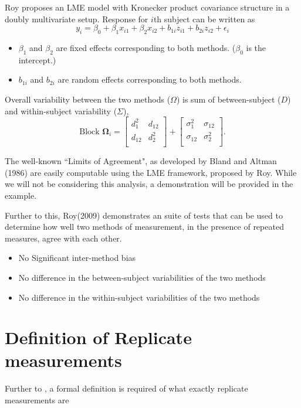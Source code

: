 \documentclass[12pt, a4paper]{report}
\theoremstyle{plain}
\theoremstyle{definition}
\theoremstyle{remark}
\begin{document}
	
	Roy proposes an LME model with Kronecker product covariance structure in a doubly multivariate setup. Response for $i$th subject can be written as
	\[ y_i = \beta_0 + \beta_1x_{i1} + \beta_2x_{i2} + b_{1i}z_{i1}  + b_{2i}z_{i2} + \epsilon_i \]
	\begin{itemize}
		\item $\beta_1$ and $\beta_2$ are fixed effects corresponding to both methods. ($\beta_0$ is the intercept.)
		\item $b_{1i}$ and $b_{2i}$ are random effects corresponding to both methods.
	\end{itemize}
	
	Overall variability between the two methods ($\Omega$) is sum of between-subject ($D$) and within-subject variability ($\Sigma$),
	\[
	\mbox{Block } \boldsymbol{\Omega}_i = \left[ \begin{array}{cc} d^2_1 & d_{12}\\ d_{12} & d^2_2\\ \end{array} \right]
	+ \left[\begin{array}{cc} \sigma^2_1 & \sigma_{12}\\ \sigma_{12} & \sigma^2_2\\ \end{array}\right].
	\]
	
	The well-known ``Limits of Agreement", as developed by Bland and Altman (1986) are easily computable using the LME framework, proposed by Roy. While we will not be considering this analysis, a demonstration will be provided in the example.
	
	Further to this, Roy(2009) demonstrates an suite of tests that can be used to determine how well two methods of measurement, in the presence of repeated measures, agree with each other.
	
	\begin{itemize}\itemsep0.5cm
		\item No Significant inter-method bias
		\item No difference in the between-subject variabilities of the two methods
		\item No difference in the within-subject variabilities of the two methods
	\end{itemize}
	
	\section{Definition of Replicate measurements}
	Further to \citet{BA99}, a formal definition is required of what exactly replicate measurements are
	
\end{document}
